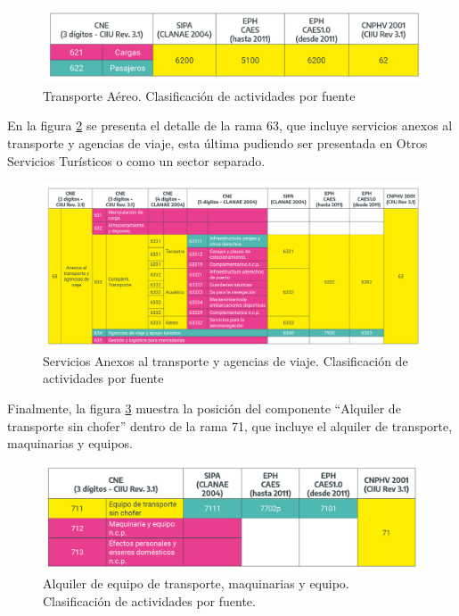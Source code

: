 \documentclass[
  openany]{book}
\begin{document}
\begin{figure}

{\centering \includegraphics[width=1\linewidth]{imagenes/figura3.8} 

}

\caption{Transporte Aéreo. Clasificación de actividades por fuente}\label{fig:empleofuentes8}
\end{figure}

En la figura \ref{fig:empleofuentes9} se presenta el detalle de la rama 63, que incluye servicios anexos al transporte y agencias de viaje, esta última pudiendo ser presentada en Otros Servicios Turísticos o como un sector separado.

\begin{figure}

{\centering \includegraphics[width=1\linewidth]{imagenes/figura3.9} 

}

\caption{Servicios Anexos al transporte y agencias de viaje. Clasificación de actividades por fuente}\label{fig:empleofuentes9}
\end{figure}

Finalmente, la figura \ref{fig:empleofuentes10} muestra la posición del componente ``Alquiler de transporte sin chofer'' dentro de la rama 71, que incluye el alquiler de transporte, maquinarias y equipos.

\begin{figure}

{\centering \includegraphics[width=1\linewidth]{imagenes/figura3.10} 

}

\caption{ Alquiler de equipo de transporte, maquinarias y equipo. Clasificación de actividades por fuente.}\label{fig:empleofuentes10}
\end{figure}
\end{document}
